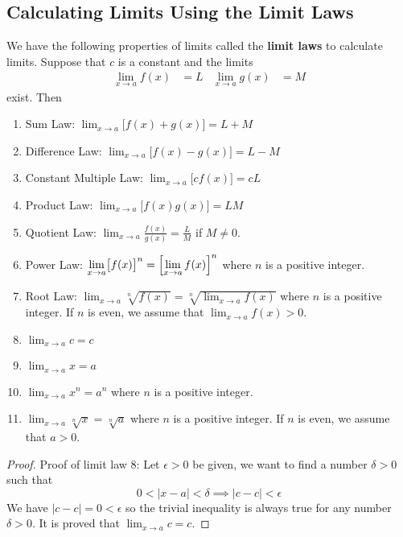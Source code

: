 \subsection{Calculating Limits Using the Limit Laws}

We have the following properties of limits called the \textbf{limit laws} to
calculate limits.
Suppose that \(c\) is a constant and the limits
\begin{align*}
    \lim_{x\to a}f(x) &= L & \lim_{x\to a}g(x) &= M
\end{align*}
exist.
Then
\begin{enumerate}
    \item Sum Law: \(\displaystyle{\lim_{x\to a}\bigl[f(x)+g(x)\bigr]=L+M}\)
    \item Difference Law: \(\displaystyle{\lim_{x\to a}\bigl[f(x)-g(x)\bigr]=L-M}\)
    \item Constant Multiple Law: \(\displaystyle{\lim_{x\to a}\bigl[cf(x)\bigr]=cL}\)
    \item Product Law: \(\displaystyle{\lim_{x\to a}\bigl[f(x)g(x)\bigr]=LM}\)
    \item Quotient Law:
    \(\displaystyle{\lim_{x\to a}\frac{f(x)}{g(x)}=\frac{L}{M}}\) if
    \(M\neq 0\).
    \item Power Law: \(\displaystyle{\lim_{x\to a}\bigl[f(x)\bigr]^n
    =\Bigl[\lim_{x\to a}f(x)\Bigr]^n}\) where \(n\) is a positive integer.
    \item Root Law: \(\displaystyle{\lim_{x\to a}\sqrt[n]{f(x)}
    =\sqrt[n]{\lim_{x\to a}f(x)}}\) where \(n\) is a positive integer.
    If \(n\) is even,
    we assume that \(\displaystyle{\lim_{x\to a}f(x)>0}\).
    \item \(\displaystyle{\lim_{x\to a}c=c}\)
    \item \(\displaystyle{\lim_{x\to a}x=a}\)
    \item \(\displaystyle{\lim_{x\to a}x^n=a^n}\) where \(n\) is a positive
    integer.
    \item \(\displaystyle{\lim_{x\to a}\sqrt[n]{x}=\sqrt[n]{a}}\) where \(n\)
    is a positive integer.
    If \(n\) is even,
    we assume that \(a>0\).
\end{enumerate}
\begin{proof}
    Proof of limit law 8:
    Let \(\epsilon>0\) be given,
    we want to find a number \(\delta>0\) such that
    \[0<|x-a|<\delta\implies|c-c|<\epsilon\]
    We have \(|c-c|=0<\epsilon\) so the trivial inequality is always true for
    any number \(\delta>0\).
    It is proved that \(\displaystyle{\lim_{x\to a}c=c}\).
\end{proof}
